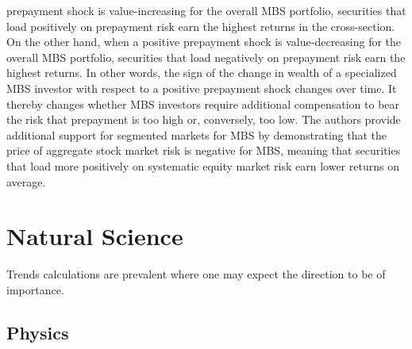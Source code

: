 \documentclass[11pt]{book}
\begin{document}
\begin{itemize}
prepayment shock is value-increasing for the overall MBS portfolio,
securities that load positively on prepayment risk earn the highest
returns in the cross-section. On the other hand, when a positive prepayment
shock is value-decreasing for the overall MBS portfolio, securities
that load negatively on prepayment risk earn the highest returns.
In other words, the sign of the change in wealth of a specialized
MBS investor with respect to a positive prepayment shock changes over
time. It thereby changes whether MBS investors require additional
compensation to bear the risk that prepayment is too high or, conversely,
too low. The authors provide additional support for segmented markets
for MBS by demonstrating that the price of aggregate stock market
risk is negative for MBS, meaning that securities that load more positively
on systematic equity market risk earn lower returns on average.
\end{itemize}

\section{Natural Science}

Trends calculations are prevalent where one may expect the direction
to be of importance.

\subsection{Physics}
\end{document}
